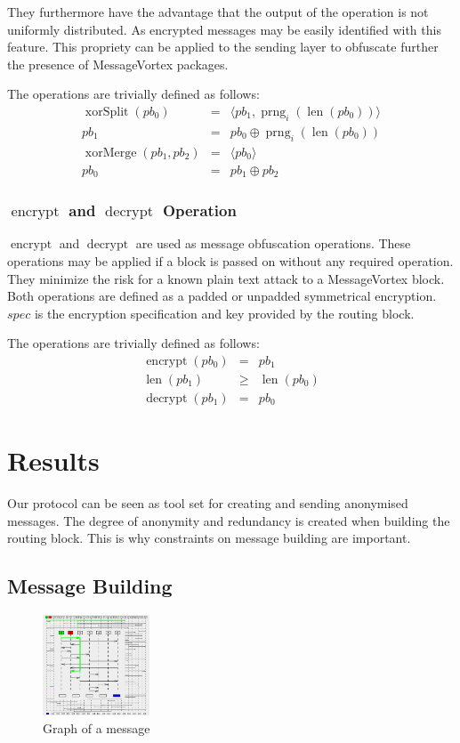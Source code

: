 \documentclass[9pt,journal,compsoc]{IEEEtran}
\DeclareMathOperator{\prng}{prng}
\DeclareMathOperator{\len}{len}
\DeclareMathOperator{\xorSplit}{xorSplit}
\DeclareMathOperator{\xorMerge}{xorMerge}
\DeclareMathOperator{\encrypt}{encrypt}
\DeclareMathOperator{\decrypt}{decrypt}
\begin{document}
They furthermore have the advantage that the output of the operation is not uniformly distributed. As encrypted messages may be easily identified with this feature. This propriety can be applied to the sending layer to obfuscate further the presence of MessageVortex packages.

The operations are trivially defined as follows:
\begin{eqnarray}
\xorSplit(pb_0) & = &\langle pb_1, \prng_i(\len(pb_0)) \rangle\\
pb_1 & = & pb_0 \oplus \prng_i(\len(pb_0))\\
\xorMerge(pb_1,pb_2) & = &\langle pb_0 \rangle\\
pb_0 & = & pb_1 \oplus pb_2
\end{eqnarray}

\subsubsection{$\encrypt$ and $\decrypt$ Operation}
$\encrypt$ and $\decrypt$ are used as message obfuscation operations. These operations may be applied if a block is passed on without any required operation. They minimize the risk for a known plain text attack to a MessageVortex block. Both operations are defined as a padded or unpadded symmetrical encryption. $spec$ is the encryption specification and key provided by the routing block.

The operations are trivially defined as follows:
\begin{eqnarray}
\encrypt(pb_0) & = & pb_1 \\
\len(pb_1) & \geq & \len(pb_0)\\
\decrypt(pb_1) & = & pb_0
\end{eqnarray}

\section{Results}
Our protocol can be seen as tool set for creating and sending anonymised messages. The degree of anonymity and redundancy is created when building the routing block. This is why constraints on message building are important.

\subsection{Message Building}
\begin{figure}[!t]
	\centering
	\includegraphics[width=\columnwidth,height=3cm]{msgGraph3}
	\caption{Graph of a message}
	\label{fig:mgsGraph}
\end{figure}
\end{document}
